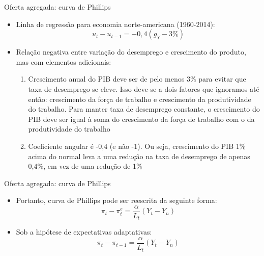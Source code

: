 \documentclass[10pt]{beamer}
\begin{document}
\begin{frame}
    {Oferta agregada: curva de Phillips}
    \begin{itemize}
        \item Linha de regressão para economia norte-americana (1960-2014):
        \[
            u_t - u_{t-1} = -0,4(g_Y - 3\%)
        \]
        \item Relação negativa entre variação do desemprego e crescimento do produto, mas com elementos adicionais:\medskip
        \begin{enumerate}
            \item Crescimento anual do PIB deve ser de pelo menos 3\% para evitar que taxa de desemprego se eleve. Isso deve-se a dois fatores que ignoramos até então: crescimento da força de trabalho e crescimento da produtividade do trabalho. Para manter taxa de desemprego constante, o crescimento do PIB deve ser igual à soma do crescimento da força de trabalho com o da produtividade do trabalho\medskip
            \item Coeficiente angular é -0,4 (e não -1). Ou seja, crescimento do PIB 1\% acima do normal leva a uma redução na taxa de desemprego de apenas 0,4\%, em vez de uma redução de 1\%
        \end{enumerate}
    \end{itemize}
\end{frame}

\begin{frame}
    {Oferta agregada: curva de Phillips}
    \begin{itemize}
        \item Portanto, curva de Phillips pode ser reescrita da seguinte forma:
        \begin{equation}
            \pi_t - \pi_t^e = \frac{\alpha}{L_t}(Y_t - Y_n)
        \end{equation}
        \item Sob a hipótese de expectativas adaptativas:
        \begin{equation}
            \pi_t - \pi_{t-1} = \frac{\alpha}{L_t}(Y_t - Y_n)
        \end{equation}
    \end{itemize}
\end{frame}
\end{document}
